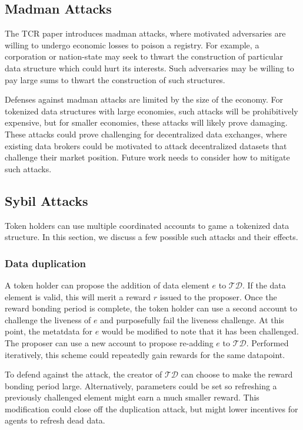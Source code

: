 \documentclass{llncs}
\begin{document}
\subsection{Madman Attacks}
The TCR paper \cite{goldin2017tcr} introduces madman attacks, where motivated adversaries are willing to undergo economic losses to poison a registry. For example, a corporation or nation-state may seek to thwart the construction of particular data structure which could hurt its interests. Such adversaries may be willing to pay large sums to thwart the construction of such structures.

Defenses against madman attacks are limited by the size of the economy. For tokenized data structures with large economies, such attacks will be prohibitively expensive, but for smaller economies, these attacks will likely prove damaging. These attacks could prove challenging for decentralized data exchanges, where existing data brokers could be motivated to attack decentralized datasets that challenge their market position. Future work needs to consider how to mitigate such attacks.

\subsection{Sybil Attacks}

Token holders can use multiple coordinated accounts to game a tokenized data structure. In this section, we discuss a few possible such attacks and their effects.

\subsubsection{Data duplication}
A token holder can propose the addition of data element $e$ to $\mathcal{TD}$. If the data element is valid, this will merit a reward $r$ issued to the proposer. Once the reward bonding period is complete, the token holder can use a second account to challenge the liveness of $e$ and purposefully fail the liveness challenge. At this point, the metatdata for $e$ would be modified to note that it has been challenged. The proposer can use a new account to propose re-adding $e$ to $\mathcal{TD}$. Performed iteratively, this scheme could repeatedly gain rewards for the same datapoint.

To defend against the attack, the creator of $\mathcal{TD}$ can choose to make the reward bonding period large. Alternatively, parameters could be set so refreshing a previously challenged element might earn a much smaller reward. This modification could close off the duplication attack, but might lower incentives for agents to refresh dead data. 
\end{document}
